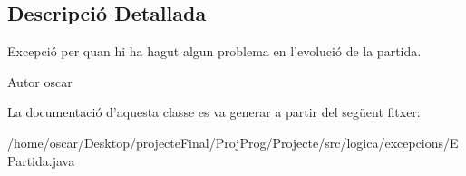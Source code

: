 \subsection{Descripció Detallada}
Excepció per quan hi ha hagut algun problema en l'evolució de la partida. 

\begin{DoxyAuthor}{Autor}
oscar 
\end{DoxyAuthor}


La documentació d'aquesta classe es va generar a partir del següent fitxer\+:\begin{DoxyCompactItemize}
\item 
/home/oscar/\+Desktop/projecte\+Final/\+Proj\+Prog/\+Projecte/src/logica/excepcions/E\+Partida.\+java\end{DoxyCompactItemize}
